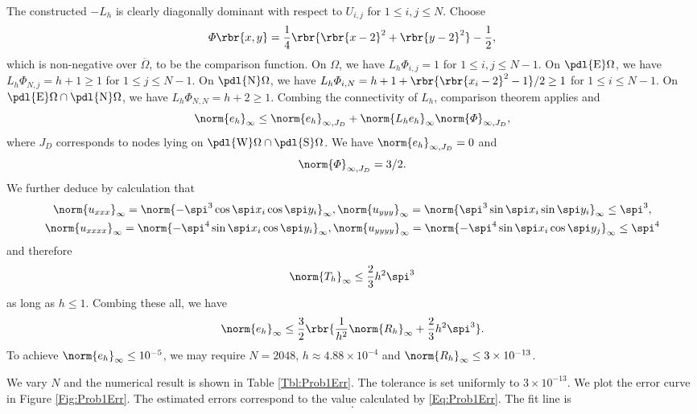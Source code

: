 \documentclass[english, nochinese]{pnote}
\newcommand\normi[1]{\norm{#1}_{\infty}}
\begin{document}
The constructed $-L_h$ is clearly diagonally dominant with respect to $ U_{ i, j } $ for $ 1 \le i, j \le N $. Choose
\begin{equation}
\varPhi \rbr{ x, y } = \frac{1}{4} \rbr{ \rbr{ x - 2 }^2 + \rbr{ y - 2 }^2 } - \frac{1}{2},
\end{equation}
which is non-negative over $\overline{\Omega}$, to be the comparison function. On $\Omega$, we have $ L_h \varPhi_{ i, j } = 1 $ for $ 1 \le i, j \le N - 1 $. On $ \pdl{\text{E}} \Omega $, we have $ L_h \varPhi_{ N, j } = h + 1 \ge 1 $ for $ 1 \le j \le N - 1 $. On $ \pdl{\text{N}} \Omega $, we have $ L_h \varPhi_{ i, N } = h + 1 + \rbr{ \rbr{ x_i - 2 }^2 - 1 } / 2 \ge 1 $ for $ 1 \le i \le N - 1 $.
On $ \pdl{\text{E}} \Omega \cap \pdl{\text{N}} \Omega $, we have $ L_h \varPhi_{ N, N } = h + 2 \ge 1 $. Combing the connectivity of $L_h$, comparison theorem applies and
\begin{equation}
\normi{e_h} \le \norm{e_h}_{ \infty, J_D } + \normi{ L_h e_h } \norm{\varPhi}_{ \infty, J_D },
\end{equation}
where $J_D$ corresponds to nodes lying on $ \pdl{\text{W}} \Omega \cap \pdl{\text{S}} \Omega $. We have $ \norm{e_h}_{ \infty, J_D } = 0 $ and
\begin{equation}
\norm{\varPhi}_{ \infty, J_D } = 3 / 2.
\end{equation}
We further deduce by calculation that
\begin{gather}
\normi{u_{ x x x }} = \normi{ -\spi^3 \cos \spi x_i \cos \spi y_i }, \normi{u_{ y y y }} = \normi{ \spi^3 \sin \spi x_i \sin \spi y_i } \le \spi^3, \\
\normi{u_{ x x x x }} = \normi{ -\spi^4 \sin \spi x_i \cos \spi y_i }, \normi{u_{ y y y y }} = \normi{ -\spi^4 \sin \spi x_i \cos \spi y_j } \le \spi^4
\end{gather}
and therefore
\begin{equation}
\normi{T_h} \le \frac{2}{3} h^2 \spi^3
\end{equation}
as long as $ h \le 1 $.
Combing these all, we have
\begin{equation} \label{Eq:Prob1Err}
\normi{e_h} \le \frac{3}{2} \rbr{ \frac{1}{h^2} \normi{R_h} + \frac{2}{3} h^2 \spi^3 }.
\end{equation}
To achieve $ \normi{e_h} \le 10^{-5} $, we may require $ N = 2048 $, $ h \approx 4.88 \times 10^{-4} $ and $ \normi{R_h} \le 3 \times 10^{-13} $.

We vary $N$ and the numerical result is shown in Table \ref{Tbl:Prob1Err}. The tolerance is set uniformly to $ 3 \times 10^{-13} $. We plot the error curve in Figure \ref{Fig:Prob1Err}. The estimated errors correspond to the value calculated by \eqref{Eq:Prob1Err}. The fit line is
\begin{equation}
.
\end{equation}
\end{document}
